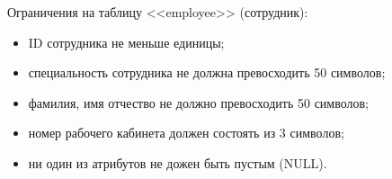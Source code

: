 Ограничения на таблицу <<employee>> (сотрудник):

\begin{itemize}
  \item ID сотрудника не меньше единицы;
  \item специальность сотрудника не должна превосходить 50 символов;
  \item фамилия, имя отчество не должно превосходить 50 символов;
  \item номер рабочего кабинета должен состоять из 3 символов;
  \item ни один из атрибутов не дожен быть пустым (NULL).
\end{itemize}
